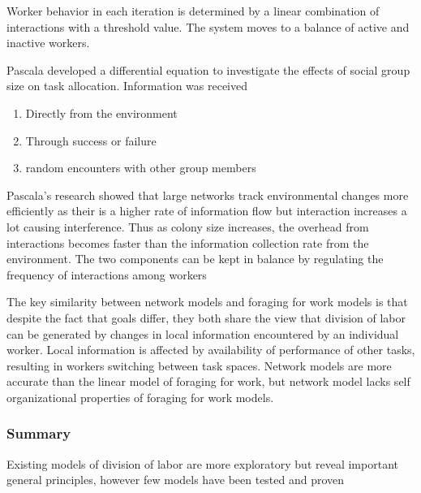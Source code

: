 Worker behavior in each iteration is determined by a linear combination of interactions with a threshold value. The system moves to a balance of active and inactive workers. 

Pascala \cite{pacala1996effects} developed a differential equation to investigate the effects of social group size on task allocation. Information was received
\begin{enumerate}
	\item Directly from the environment
	\item Through success or failure
	\item random encounters with other group members
\end{enumerate}
Pascala's research showed that large networks track environmental changes more efficiently as their is a higher rate of information flow but interaction increases a lot causing interference. Thus as colony size increases, the overhead from interactions becomes faster than the information collection rate from the environment. The two components can be kept in balance by regulating the frequency of interactions among workers \cite{pacala1996effects} %

The key similarity between network models and foraging for work models is that despite the fact that goals differ, they both share the view that division of labor can be generated by changes in local information encountered by an individual worker. Local information is affected by availability of performance of other tasks, resulting in workers switching between task spaces. Network models are more accurate than the linear model of foraging for work, but network model lacks self organizational properties of foraging for work models.

\subsubsection{Summary} 
Existing models of division of labor are more exploratory but reveal important general principles, however few models have been tested and proven



